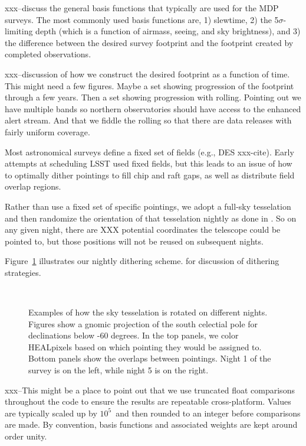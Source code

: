 \documentclass[]{aastex631}
\begin{document}
xxx--discuss the general basis functions that typically are used for the MDP surveys. The most commonly used basis functions are, 1) slewtime, 2) the 5$\sigma$-limiting depth (which is a function of airmass, seeing, and sky brightness), and 3) the difference between the desired survey footprint and the footprint created by completed observations.

xxx--discussion of how we construct the desired footprint as a function of time. This might need a few figures. Maybe a set showing progression of the footprint through a few years. Then a set showing progression with rolling. Pointing out we have multiple bands so northern observatories should have access to the enhanced alert stream. And that we fiddle the rolling so that there are data releases with fairly uniform coverage. 

Most astronomical surveys define a fixed set of fields (e.g., DES xxx-cite). Early attempts at scheduling LSST used fixed fields, but this leads to an issue of how to optimally dither pointings to fill chip and raft gaps, as well as distribute field overlap regions. 

Rather than use a fixed set of specific pointings, we adopt a full-sky tesselation and then randomize the orientation of that tesselation nightly as done in \citet{Rothchild2019}. So on any given night, there are XXX potential coordinates the telescope could be pointed to, but those positions will not be reused on subsequent nights.

Figure~\ref{fig:tesselation} illustrates our nightly dithering scheme. \citet{Awan2016} for discussion of dithering strategies. 

\begin{figure}
     \\
    \caption{Examples of how the sky tesselation is rotated on different nights. Figures show a gnomic projection of the south celectial pole for declinations below -60 degrees. In the top panels, we color HEALpixels based on which pointing they would be assigned to. Bottom panels show the overlaps between pointings. Night 1 of the survey is on the left, while night 5 is on the right. \label{fig:tesselation}}
\end{figure}

xxx--This might be a place to point out that we use truncated float comparisons throughout the code to ensure the results are repeatable cross-platform. Values are typically scaled up by $10^5$\ and then rounded to an integer before comparisons are made. By convention, basis functions and associated weights are kept around order unity.
\end{document}
